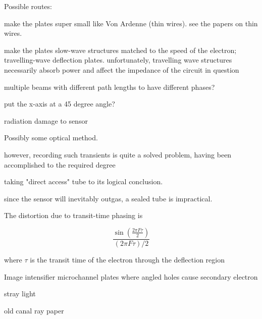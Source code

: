 \documentclass[paper.tex]{subfiles}
\begin{document}
Possible routes:

make the plates super small like Von Ardenne (thin wires). see the papers on thin wires.

make the plates slow-wave structures matched to the speed of the electron; travelling-wave deflection plates.
unfortunately, travelling wave structures necessarily absorb power and affect the impedance of the circuit in question


multiple beams with different path lengths to have different phases?

put the x-axis at a 45 degree angle?


radiation damage to sensor 

Possibly some optical method. 

however, recording such transients is quite a solved problem, having been accomplished to the required degree 

taking "direct access" tube to its logical conclusion.

since the sensor will inevitably outgas, a sealed tube is impractical.



The distortion due to transit-time phasing is

$$ \frac{\sin(\frac{2\pi F \tau}{2})}{(2\pi F \tau)/2} $$

where $\tau$ is the transit time of the electron through the deflection region 

Image intensifier microchannel plates where angled holes cause secondary electron 


stray light 

old canal ray paper
\end{document}
